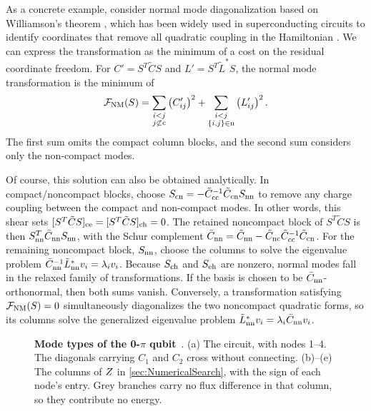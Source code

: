 As a concrete example, consider normal mode diagonalization based on Williamson's theorem \cite{Williamson1936NormalForms},
which has been widely used in superconducting circuits to identify coordinates that remove all quadratic coupling in the Hamiltonian \cite{niggBlackBoxSuperconductingCircuit2012, smithQuantizationInductivelyShunted2016,royMultimodeSuperconductingCircuits2018, gelyQuCATQuantumCircuit2020,kermanEfficientNumericalSimulation2020, ding_free-mode_2021,rasmussenSuperconductingCircuitCompanionan2021, Egusquiza_Algebraic_2022, rajabzadehAnalysisArbitrarySuperconducting2023, smitham2024reciprocallumpedelementsuperconductingcircuits}.
We can express the transformation as the minimum of a cost on the residual coordinate freedom.
For $C'=S^T\tilde C S$ and $L'=S^T\tilde L^*S$, the normal mode transformation is the minimum of
\begin{align}
\mathcal{F}_{\rm NM}(S)
=\sum_{\substack{i<j\\j\not\subset{\rm c}}}
\left(C'_{ij}\right)^2
+\sum_{\substack{i<j\\\{i,j\}\in{\rm n}}}
\left(L'_{ij}\right)^2 .
\label{eq:numerical_normal_cost}
\end{align}
The first sum omits the compact column blocks, and the second sum considers only the non-compact modes.

Of course, this solution can also be obtained analytically.
In compact/noncompact blocks, choose $S_{\rm cn}=-\tilde C_{\rm cc}^{-1}\tilde C_{\rm cn}S_{\rm nn}$ to remove any charge coupling between the compact and non-compact modes.
In other words, this shear sets $[S^T \tilde CS]_{\rm ce}=[S^T \tilde CS]_{\rm ch}=0$.
The retained noncompact block of $S^T\tilde CS$ is then $S_{\rm nn}^T\bar C_{\rm nn}S_{\rm nn}$, with the Schur complement $\bar C_{\rm nn}=\tilde C_{\rm nn}-\tilde C_{\rm nc}\tilde C_{\rm cc}^{-1}\tilde C_{\rm cn}$.
For the remaining noncompact block, $S_{\rm nn}$, choose the columns to solve the eigenvalue problem $\bar C_{\rm nn}^{-1}\tilde L^*_{\rm nn}v_i=\lambda_iv_i$.
Because $S_{\rm ch}$ and $S_{\rm eh}$ are nonzero, normal modes fall in the relaxed family of transformations.
If the basis is chosen to be $\bar C_{\rm nn}$-orthonormal, then both sums vanish.
Conversely, a transformation satisfying $\mathcal{F}_{\rm NM}(S)=0$ simultaneously diagonalizes the two noncompact quadratic forms, so its columns solve the generalized eigenvalue problem $\tilde L^*_{\rm nn}v_i=\lambda_i\bar C_{\rm nn}v_i$.

\begin{figure}[t]
    \centering
    
    \caption{{\bf Mode types of the 0-$\pi$ qubit}~\cite{brooks2013,Dempster2014understanding,groszkowski2018}.
    (a) The circuit, with nodes 1--4.
    The diagonals carrying $C_1$ and $C_2$ cross without connecting.
    (b)--(e) The columns of $Z$ in \cref{sec:NumericalSearch}, with the sign of each node's entry.
    Grey branches carry no flux difference in that column, so they contribute no energy.}
    \label{fig:zeropi}
\end{figure}

